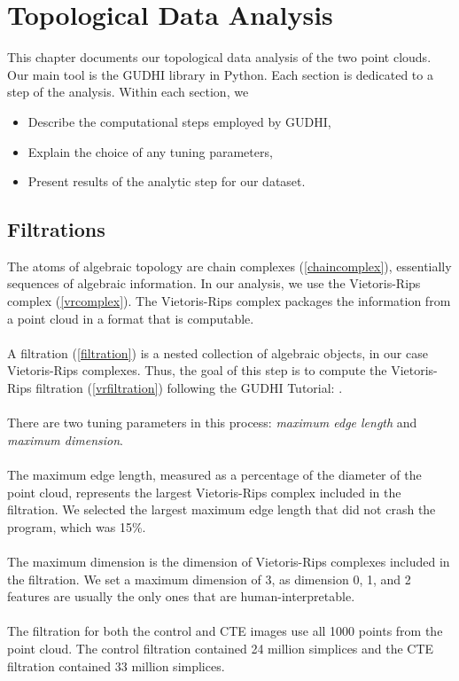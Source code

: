\chapter{Topological Data Analysis}

This chapter documents our topological data analysis of the two point clouds. Our main tool is the GUDHI library in Python. \cite{gudhi:manual} Each section is dedicated to a step of the analysis. Within each section, we
\begin{itemize}
    \item Describe the computational steps employed by GUDHI,
    \item Explain the choice of any tuning parameters,
    \item Present results of the analytic step for our dataset.
\end{itemize}

\section{Filtrations}
The atoms of algebraic topology are chain complexes (\cref{chaincomplex}), essentially sequences of algebraic information. In our analysis, we use the Vietoris-Rips complex (\cref{vrcomplex}). The Vietoris-Rips complex packages the information from a point cloud in a format that is computable.
\\\\
A filtration (\cref{filtration}) is a nested collection of algebraic objects, in our case Vietoris-Rips complexes. Thus, the goal of this step is to compute the Vietoris-Rips filtration (\cref{vrfiltration}) following the GUDHI Tutorial: \cite{gudhi_tutorial_complexes}.
\\\\
There are two tuning parameters in this process: \textit{maximum edge length} and \textit{maximum dimension}. 
\\\\
The maximum edge length, measured as a percentage of the diameter of the point cloud, represents the largest Vietoris-Rips complex included in the filtration. We selected the largest maximum edge length that did not crash the program, which was 15\%.
\\\\
The maximum dimension is the dimension of Vietoris-Rips complexes included in the filtration. We set a maximum dimension of 3, as dimension 0, 1, and 2 features are usually the only ones that are human-interpretable.
\\\\
The filtration for both the control and CTE images use all 1000 points from the point cloud. The control filtration contained 24 million simplices and the CTE filtration contained 33 million simplices.

